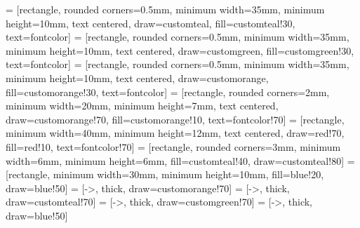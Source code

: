  = [rectangle, rounded corners=0.5mm, minimum width=35mm, minimum height=10mm, text centered, draw=customteal, fill=customteal!30, text=fontcolor]
 = [rectangle, rounded corners=0.5mm, minimum width=35mm, minimum height=10mm, text centered, draw=customgreen, fill=customgreen!30, text=fontcolor]
 = [rectangle, rounded corners=0.5mm, minimum width=35mm, minimum height=10mm, text centered, draw=customorange, fill=customorange!30, text=fontcolor]
 = [rectangle, rounded corners=2mm, minimum width=20mm, minimum height=7mm, text centered, draw=customorange!70, fill=customorange!10, text=fontcolor!70]
 = [rectangle, minimum width=40mm, minimum height=12mm, text centered, draw=red!70, fill=red!10, text=fontcolor!70]
 = [rectangle, rounded corners=3mm, minimum width=6mm, minimum height=6mm, fill=customteal!40, draw=customteal!80]
 = [rectangle, minimum width=30mm, minimum height=10mm, fill=blue!20, draw=blue!50]
 = [->, thick, draw=customorange!70]
 = [->, thick, draw=customteal!70]
 = [->, thick, draw=customgreen!70]
 = [->, thick, draw=blue!50]


